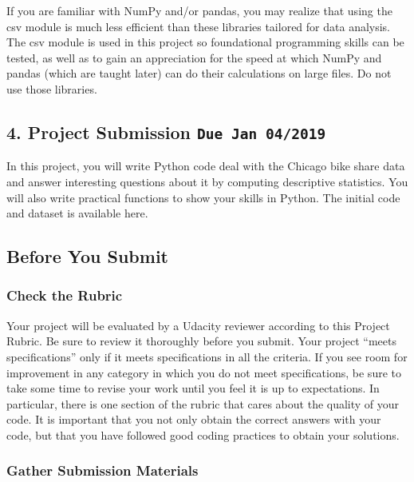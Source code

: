 \documentclass[]{book}
\begin{document}
If you are familiar with NumPy and/or pandas, you may realize that using
the csv module is much less efficient than these libraries tailored for
data analysis. The csv module is used in this project so foundational
programming skills can be tested, as well as to gain an appreciation for
the speed at which NumPy and pandas (which are taught later) can do
their calculations on large files. Do not use those libraries.

\subsection{\texorpdfstring{4. Project Submission
\texttt{Due\ Jan\ 04/2019}}{4. Project Submission Due Jan 04/2019}}\label{project-submission-due-jan-042019}

In this project, you will write Python code deal with the Chicago bike
share data and answer interesting questions about it by computing
descriptive statistics. You will also write practical functions to show
your skills in Python. The initial code and dataset is available here.

\subsection{Before You Submit}\label{before-you-submit}

\subsubsection{Check the Rubric}\label{check-the-rubric}

Your project will be evaluated by a Udacity reviewer according to this
Project Rubric. Be sure to review it thoroughly before you submit. Your
project ``meets specifications'' only if it meets specifications in all
the criteria. If you see room for improvement in any category in which
you do not meet specifications, be sure to take some time to revise your
work until you feel it is up to expectations. In particular, there is
one section of the rubric that cares about the quality of your code. It
is important that you not only obtain the correct answers with your
code, but that you have followed good coding practices to obtain your
solutions.

\subsubsection{Gather Submission
Materials}\label{gather-submission-materials}
\end{document}
